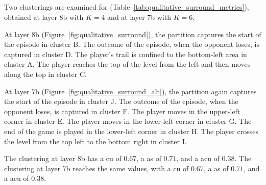 \cleartoleftpage
\subsection{\SurroundName}

Two clusterings are examined for \SurroundName (Table~\ref{tab:qualitative_surround_metrics}), obtained at layer 8b with $K=4$ and at layer 7b with $K=6$.

At layer 8b (Figure~\ref{fig:qualitative_surround}), the partition captures the start of the episode in cluster B.
The outcome of the episode, when the opponent loses, is captured in cluster D.
The player's trail is confined to the bottom-left area in cluster A.
The player reaches the top of the level from the left and then moves along the top in cluster C.

At layer 7b (Figure~\ref{fig:qualitative_surround_alt}), the partition again captures the start of the episode in cluster J.
The outcome of the episode, when the opponent loses, is captured in cluster F.
The player moves in the upper-left corner in cluster E.
The player moves in the lower-left corner in cluster G.
The end of the game is played in the lower-left corner in cluster H.
The player crosses the level from the top left to the bottom right in cluster I.

The clustering at layer 8b has a \gls{cu} of $0.67$, a \gls{as} of $0.71$, and a \gls{acu} of $0.38$.
The clustering at layer 7b reaches the same values, with a \gls{cu} of $0.67$, a \gls{as} of $0.71$, and a \gls{acu} of $0.38$.

